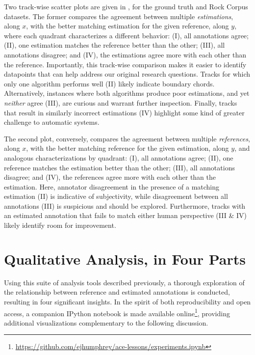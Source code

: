 \documentclass{article}
\begin{document}
Two track-wise scatter plots are given in , for the ground truth and Rock Corpus datasets.
The former compares the agreement between multiple \emph{estimations}, along $x$, with the better matching estimation for the given reference, along $y$, where each quadrant characterizes a different behavior:
(I), all annotations agree;
(II), one estimation matches the reference better than the other;
(III), all annotations disagree;
and (IV), the estimations agree more with each other than the reference.
Importantly, this track-wise comparison makes it easier to identify datapoints that can help address our original research questions.
Tracks for which only one algorithm performs well (II) likely indicate boundary chords.
Alternatively, instances where both algorithms produce poor estimations, and yet \emph{neither} agree (III), are curious and warrant further inspection.
Finally, tracks that result in similarly incorrect estimations (IV) highlight some kind of greater challenge to automatic systems.

The second plot, conversely, compares the agreement between multiple \emph{references}, along $x$, with the better matching reference for the given estimation, along $y$, and analogous characterizations by quadrant:
(I), all annotations agree;
(II), one reference matches the estimation better than the other;
(III), all annotations disagree;
and (IV), the references agree more with each other than the estimation.
Here, annotator disagreement in the presence of a matching estimation (II) is indicative of subjectivity, while disagreement between all annotations (III) is suspicious and should be explored.
Furthermore, tracks with an estimated annotation that fails to match either human perspective (III \& IV) likely identify room for improvement.


\section{Qualitative Analysis, in Four Parts}
\label{sec:analysis}

Using this suite of analysis tools described previously, a thorough exploration of the relationship between reference and estimated annotations is conducted, resulting in four significant insights.
In the spirit of both reproducibility and open access, a companion IPython notebook is made available online\footnote{\url{https://github.com/ejhumphrey/ace-lessons/experiments.ipynb}}, providing additional visualizations complementary to the following discussion.
\end{document}
